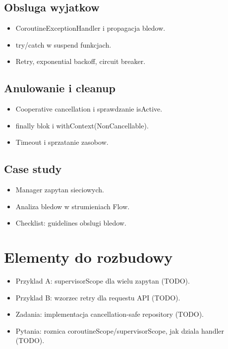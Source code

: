 \subsection{Obsluga wyjatkow}
\begin{itemize}
  \item CoroutineExceptionHandler i propagacja bledow.
  \item try/catch w suspend funkcjach.
  \item Retry, exponential backoff, circuit breaker.
\end{itemize}

\subsection{Anulowanie i cleanup}
\begin{itemize}
  \item Cooperative cancellation i sprawdzanie isActive.
  \item finally blok i withContext(NonCancellable).
  \item Timeout i sprzatanie zasobow.
\end{itemize}

\subsection{Case study}
\begin{itemize}
  \item Manager zapytan sieciowych.
  \item Analiza bledow w strumieniach Flow.
  \item Checklist: guidelines obslugi bledow.
\end{itemize}

\section{Elementy do rozbudowy}
\begin{itemize}
  \item Przyklad A: supervisorScope dla wielu zapytan (TODO).
  \item Przyklad B: wzorzec retry dla requestu API (TODO).
  \item Zadania: implementacja cancellation-safe repository (TODO).
  \item Pytania: roznica coroutineScope/supervisorScope, jak dziala handler (TODO).
\end{itemize}

